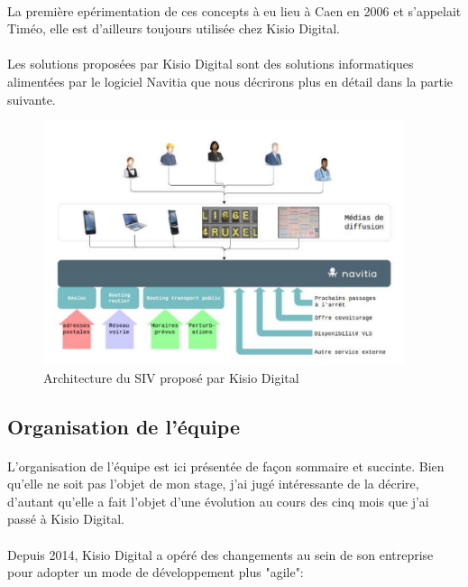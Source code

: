 \documentclass[a4paper]{report}
\begin{document}
\paragraph{} La première epérimentation de ces concepts à eu lieu à Caen en 2006 et s'appelait Timéo, elle est d'ailleurs toujours utilisée chez Kisio Digital.

\paragraph{} Les solutions proposées par Kisio Digital sont des solutions informatiques alimentées par le logiciel Navitia que nous décrirons plus en détail dans la partie suivante. 

\begin{figure}[H] 
	\begin{center}
		\includegraphics[width=300pt]{image/archi_SIV}
		\caption{Architecture du SIV proposé par Kisio Digital}
		\label{Architecture du SIV proposé par Kisio Digital}
	\end{center}
\end{figure}
\subsection{Organisation de l'équipe}

\paragraph{} L'organisation de l'équipe est ici présentée de façon sommaire et succinte. Bien qu'elle ne soit pas l'objet de mon stage, j'ai jugé intéressante de la décrire, d'autant qu'elle a fait l'objet d'une évolution au cours des cinq mois que j'ai passé à Kisio Digital.

\paragraph {}Depuis 2014, Kisio Digital a opéré des changements au sein de son entreprise pour adopter un mode de développement plus "agile":
\end{document}
